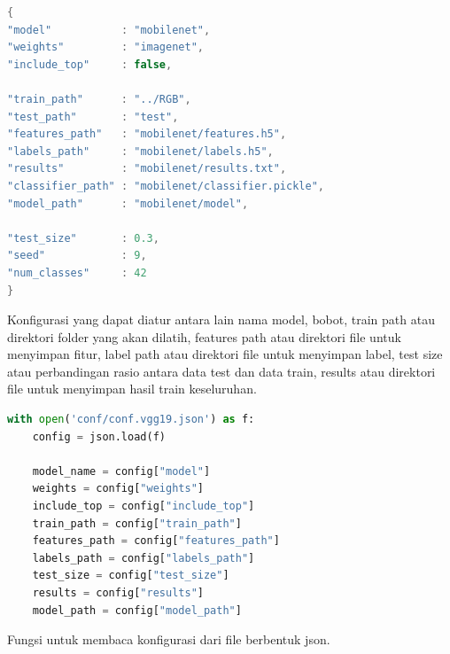 \begin{lstlisting}[language=java, caption=Konfigurasi, label=code:config, firstnumber=1]
{
"model"           : "mobilenet",
"weights"         : "imagenet",
"include_top"     : false,

"train_path"      : "../RGB",
"test_path"		  : "test",
"features_path"   : "mobilenet/features.h5",
"labels_path"     : "mobilenet/labels.h5",
"results"         : "mobilenet/results.txt",
"classifier_path" : "mobilenet/classifier.pickle",
"model_path"	  : "mobilenet/model",

"test_size"       : 0.3,
"seed"            : 9,
"num_classes"     : 42
}
\end{lstlisting}
\par Konfigurasi yang dapat diatur antara lain nama model, bobot, train path atau direktori folder yang akan dilatih, features path atau direktori file untuk menyimpan fitur, label path atau direktori file untuk menyimpan label, test size atau perbandingan rasio antara data test dan data train, results atau direktori file untuk menyimpan hasil train keseluruhan. 
\begin{lstlisting}[language=python, caption=Membaca konfigurasi, label=code:open_config, firstnumber=37]
	with open('conf/conf.vgg19.json') as f:
	config = json.load(f)
	
	model_name = config["model"]
	weights = config["weights"]
	include_top = config["include_top"]
	train_path = config["train_path"]
	features_path = config["features_path"]
	labels_path = config["labels_path"]
	test_size = config["test_size"]
	results = config["results"]
	model_path = config["model_path"]
\end{lstlisting}
\par Fungsi untuk membaca konfigurasi dari file berbentuk json. 

